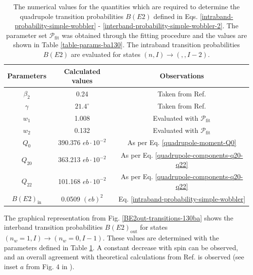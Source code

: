 \begin{table}
    \centering
    \begin{tabular}{|c|c|c|}
    \hline
    Parameters & Calculated values & Observations                                               \\ \hline
    $\beta_2$  & 0.24              & Taken from Ref. \cite{chen2019transverse}                 \\ \hline
    $\gamma$   & $21.4^\circ$      & Taken from Ref. \cite{chen2019transverse}                 \\ \hline
    $w_1$      & 1.008             & Evaluated with $\mathcal{P}_\text{fit}$                    \\ \hline
    $w_2$      & 0.132             & Evaluated with $\mathcal{P}_\text{fit}$                    \\ \hline
    $Q_0$      & 390.376 $eb\cdot10^{-2}$      & As per Eq. \ref{quadrupole-moment-Q0}                                                           \\ \hline
    $Q_{20}$   & 363.213 $eb\cdot10^{-2}$          & As per Eq. \ref{quadrupole-components-q20-q22}                                                            \\ \hline
    $Q_{22}$   & 101.168 $eb\cdot10^{-2}$           & As per Eq. \ref{quadrupole-components-q20-q22}                                                            \\ \hline
    $B(E2)_\text{in}$ &        0.0509 $(eb)^2$          & Eq. \ref{intraband-probability-simple-wobbler}              \\ \hline
    \end{tabular}%
    \caption{The numerical values for the quantities which are required to determine the quadrupole transition probabilities $B(E2)$ defined in Eqs. \ref{intraband-probability-simple-wobbler} - \ref{interband-probability-simple-wobbler-2}. The parameter set $\mathcal{P}_\text{fit}$ was obtained through the fitting procedure and the values are shown in Table \ref{table-params-ba130}. The intraband transition probabilities $B(E2)$ are evaluated for states $(n,I)\to(,,I-2)$.}
    \label{transition-parameters-ba130}
\end{table}

The graphical representation from Fig. \ref{BE2out-transitions-130ba} shows the interband transition probabilities $B(E2)_\text{out}$ for states $(n_w=1,I)\to(n_w=0,I-1)$. These values are determined with the parameters defined in Table \ref{transition-parameters-ba130}. A constant decrease with spin can be observed, and an overall agreement with theoretical calculations from Ref. \cite{chen2019transverse} is observed (see inset $a$ from Fig. 4 in \cite{chen2019transverse}).

